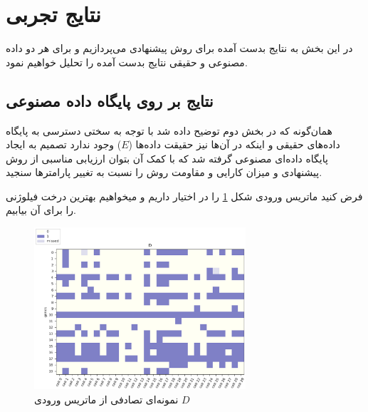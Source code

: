 \newpage
\section{نتایج تجربی}
در این بخش به نتایج بدست آمده برای روش پیشنهادی می‌پردازیم و برای هر دو داده مصنوعی و حقیقی نتایج بدست آمده را تحلیل خواهیم نمود.
\subsection{نتایج بر روی پایگاه داده مصنوعی}
همان‌گونه که در بخش دوم توضیح داده شد با توجه به سختی دسترسی به پایگاه داده‌های حقیقی و اینکه در آن‌ها نیز حقیقت داده‌ها ($E$) وجود ندارد تصمیم به ایجاد پایگاه داده‌ای مصنوعی گرفته شد که با کمک آن بتوان ارزیابی مناسبی از روش پیشنهادی و میزان کارایی و مقاومت روش را نسبت به تغییر پارامترها سنجید.

فرض کنید ماتریس ورودی شکل \ref{fig:sy_D1} را در اختیار داریم و میخواهیم بهترین درخت فیلوژنی را برای آن بیابیم.
\begin{figure}[!ht]
	\centering
	\includegraphics[width=0.7\textwidth]{img/res/D1}
	\caption{نمونه‌ای تصادفی از ماتریس ورودی $D$}
	\label{fig:sy_D1}
\end{figure}

